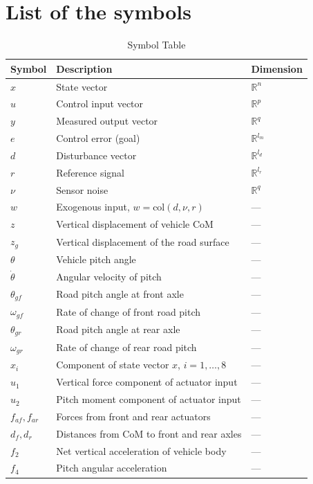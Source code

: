 \documentclass[]{report}
\begin{document}
	\section{List of the symbols}
\begin{table}[H]
	\centering
	\caption{Symbol Table}
	\begin{tabular}{lll}
		\toprule
		\textbf{Symbol} & \textbf{Description} & \textbf{Dimension} \\
		\midrule
		$x$ & State vector & $\mathbb{R}^n$ \\
		$u$ & Control input vector & $\mathbb{R}^p$ \\
		$y$ & Measured output vector & $\mathbb{R}^q$ \\
		$e$ & Control error (goal) & $\mathbb{R}^{l_m}$ \\
		$d$ & Disturbance vector & $\mathbb{R}^{l_d}$ \\
		$r$ & Reference signal & $\mathbb{R}^{l_r}$ \\
		$\nu$ & Sensor noise & $\mathbb{R}^q$ \\
		$w$ & Exogenous input, $w = \text{col}(d, \nu, r)$ & --- \\
		$z$ & Vertical displacement of vehicle CoM & --- \\
		$z_g$ & Vertical displacement of the road surface & --- \\
		$\theta$ & Vehicle pitch angle & --- \\
		$\dot{\theta}$ & Angular velocity of pitch & --- \\
		$\theta_{gf}$ & Road pitch angle at front axle & --- \\
		$\omega_{gf}$ & Rate of change of front road pitch & --- \\
		$\theta_{gr}$ & Road pitch angle at rear axle & --- \\
		$\omega_{gr}$ & Rate of change of rear road pitch & --- \\
		$x_i$ & Component of state vector $x$, $i = 1,\dots,8$ & --- \\
		$u_1$ & Vertical force component of actuator input & --- \\
		$u_2$ & Pitch moment component of actuator input & --- \\
		$f_{af}, f_{ar}$ & Forces from front and rear actuators & --- \\
		$d_f, d_r$ & Distances from CoM to front and rear axles & --- \\
		$f_2$ & Net vertical acceleration of vehicle body & --- \\
		$f_4$ & Pitch angular acceleration & --- \\

\end{tabular}
\end{table}
\end{document}
